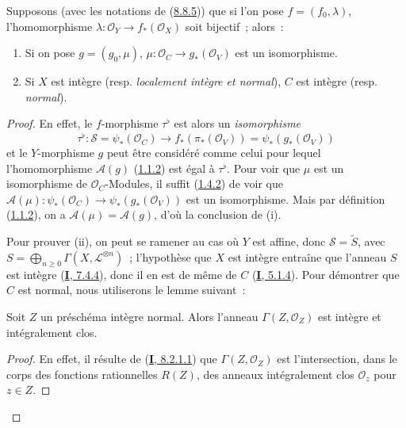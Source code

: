\begin{proposition}[8.8.6]
\label{II.8.8.6-fr}
Supposons (avec les notations de \textup{(\hyperref[II.8.8.5-fr]{8.8.5})}) que si
l'on pose $f=(f_0,\lambda)$, l'homomorphisme
$\lambda:\mathcal{O}_Y\to f_*(\mathcal{O}_X)$ soit bijectif~; alors~:
\begin{enumerate}
  \item[\rm{(i)}] Si on pose $g=(g_0,\mu)$,
  $\mu:\mathcal{O}_C\to g_*(\mathcal{O}_V)$ est un isomorphisme.
  \item[\rm{(ii)}] Si $X$ est intègre \textup{(resp. \emph{localement intègre et normal})},
  $C$ est intègre \textup{(resp. \emph{normal})}.
\end{enumerate}
\end{proposition}

\begin{proof}
En effet, le $f$-morphisme $\tau^\flat$ est alors un \emph{isomorphisme}
\[
  \tau^\flat:\mathcal{S}=\psi_*(\mathcal{O}_C)
  \longrightarrow f_*(\pi_*(\mathcal{O}_V))
  =\psi_*(g_*(\mathcal{O}_V))
\]
et le $Y$-morphisme $g$ peut être considéré comme celui pour lequel
l'homomorphisme $\mathcal{A}(g)$
(\hyperref[II.1.1.2-fr]{1.1.2}) est égal à $\tau^\flat$. Pour voir que
$\mu$ est un isomorphisme de $\mathcal{O}_C$-Modules, il suffit
(\hyperref[II.1.4.2-fr]{1.4.2}) de voir que
$\mathcal{A}(\mu):\psi_*(\mathcal{O}_C)\longrightarrow\psi_*(g_*(\mathcal{O}_V))$
est un isomorphisme. Mais par définition
(\hyperref[II.1.1.2-fr]{1.1.2}), on a
$\mathcal{A}(\mu)=\mathcal{A}(g)$, d'où la conclusion de (i).

Pour prouver (ii), on peut se ramener au cas où $Y$ est affine, donc
$\mathcal{S}=\widetilde{S}$, avec
$S=\bigoplus_{n\geqslant 0}\Gamma(X,\mathcal{L}^{\otimes n})$~;
l'hypothèse que $X$ est intègre entraîne que l'anneau $S$ est intègre
(\hyperref[I.7.4.4-fr]{\textbf{I}, 7.4.4}), donc il en est de même de $C$
(\hyperref[I.5.1.4-fr]{\textbf{I}, 5.1.4}). Pour démontrer que $C$ est normal, nous
utiliserons le lemme suivant~:

\begin{lemma}[8.8.6.1]
\label{II.8.8.6.1-fr}
Soit $Z$ un préschéma intègre normal. Alors l'anneau
$\Gamma(Z,\mathcal{O}_Z)$ est intègre et intégralement clos.
\end{lemma}

\begin{proof}
En effet, il résulte de
(\hyperref[I.8.2.1.1-fr]{\textbf{I}, 8.2.1.1}) que
$\Gamma(Z,\mathcal{O}_Z)$ est l'intersection, dans le corps des fonctions
rationnelles $R(Z)$, des anneaux intégralement clos $\mathcal{O}_z$ pour
$z\in Z$.
\end{proof}


\end{proof}
